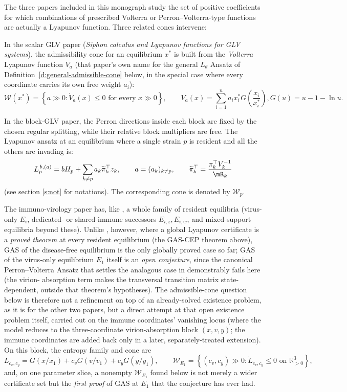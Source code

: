 
The three papers included in this  monograph study the set of positive coefficients for which combinations of prescribed
Volterra or Perron--Volterra-type functions are actually a Lyapunov function.  Three  related
cones intervene:

\BEN

\im
In the scalar GLV paper (\emph{Siphon calculus and Lyapunov functions for GLV systems}), the admissibility
cone for an equilibrium $x^*$ is built from the \emph{Volterra} Lyapunov function $V_a$ (that paper's own
name for the general $L_\theta$ Ansatz of Definition~\ref{d:general-admissible-cone} below, in the special
case where every coordinate carries its own free weight $a_i$):
\[
\mathcal W(x^*)
=
\left\{
a\gg0:
\dot V_a(x)\leq0
\text{ for every }x\gg0
\right\},
\qquad
V_a(x)
=
\sum_{i=1}^n
a_i x_i^*
G\!\left(\frac{x_i}{x_i^*}\right), G(u)=u-1-\ln u.
\]

\im
In the block-GLV paper, the Perron directions inside each block are fixed by
the chosen regular splitting, while their relative block multipliers are free. The Lyapunov ansatz at an equilibrium where a single strain $p$ is resident and all the others are invading is:
\[
L_p^{\,b,(a)}
=
bH_p
+
\sum_{k\neq p}
a_k\widetilde\pi_k^\top z_k,
\qquad
a=(a_k)_{k\ne p},
\qquad
\widetilde\pi_k^\top
=
\frac{\pi_k^\top V_k^{-1}}{\mR_k}
\]
(see section \ref{s:not} for notations).
The corresponding cone is denoted by \(\mathcal W_p\).

\im
The \cite{RecBro} immuno-virology paper has, like \cite{AAHRah}, a whole family of resident equilibria (virus-only
$E_i$, dedicated- or shared-immune successors $E_{i,z},E_{i,w}$, and mixed-support equilibria beyond these).
Unlike \cite{AAHRah}, however, where a global Lyapunov certificate is a \emph{proved theorem} at every resident
equilibrium (the GAS-CEP theorem above), GAS of the disease-free equilibrium is the only globally proved case
so far; GAS of the virus-only equilibrium $E_1$ itself is an \emph{open conjecture}, since the canonical
Perron--Volterra Ansatz that settles the analogous case in \cite{AAHRah} demonstrably fails here (the virion-
absorption term makes the transversal transition matrix state-dependent, outside that theorem's hypotheses).
The admissible-cone question below is therefore not a refinement on top of an already-solved existence
problem, as it is for the other two papers, but a direct attempt at that open existence problem itself,
carried out on the immune coordinates' vanishing locus (where the model reduces to the three-coordinate
virion-absorption block $(x,v,y)$; the immune coordinates are added back only in a later, separately-treated
extension). On this block, the entropy family and cone are
\[
L_{c_v,c_y}
=
G(x/x_1)
+
c_vG(v/v_1)
+
c_yG(y/y_1),
\qquad
\mathcal W_{E_1}
=
\left\{
(c_v,c_y)\gg0:
\dot L_{c_v,c_y}\leq0
\text{ on }\mathbb R_{>0}^3
\right\},
\]
and, on one parameter slice, a nonempty $\mathcal W_{E_1}$ found below is not merely a wider certificate set
but the \emph{first proof} of GAS at $E_1$ that the conjecture has ever had.

\EEN

